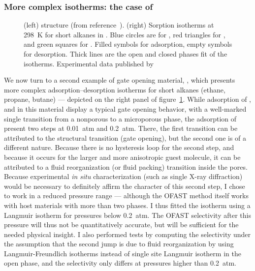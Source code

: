 \documentclass[thesis]{subfiles}
\begin{document}
\FloatBarrier
\subsubsection{More complex isotherms: the case of \RPMZn}

\begin{figure}[htp]
    \centering
    \hfill
    \raisebox{-0.5\height}{}
    \caption{(left) \RPMZn structure (from reference~\cite{Lan2009}).
    (right) Sorption isotherms at \SI{298}{K} for short
    alkanes in \RPMZn. Blue circles are for , red triangles for
    , and green squares for . Filled symbols for adsorption,
    empty symbols for desorption. Thick lines are the open and closed phases fit
    of the isotherms. Experimental data published by
    \citeauthor{Nijem2012}\cite{Nijem2012}}
    \label{fig:rpm3-zn}
\end{figure}

We now turn to a second example of gate opening material, \RPMZn\cite{Lan2009},
which presents more complex adsorption--desorption isotherms for short alkanes
(ethane, propane, butane) --- depicted on the right panel of
figure~\ref{fig:rpm3-zn}. While adsorption of , and  in this
material display a typical gate opening behavior, with a well-marked single
transition from a nonporous to a microporous phase, the adsorption of 
present two steps at \SI{0.01}{atm} and \SI{0.2}{atm}.  There, the first
transition can be attributed to the structural transition (gate opening), but
the second one is of a different nature. Because there is no hysteresis loop for
the second step, and because it occurs for the larger and more anisotropic guest
molecule, it can be attributed to a fluid reorganization (or fluid packing)
transition inside the pores. Because experimental \emph{in situ}
characterization (such as single X-ray diffraction) would be necessary to
definitely affirm the character of this second step, I chose to work in a
reduced pressure range --- although the OFAST method itself works with host
materials with more than two phases. I thus fitted the  isotherm using
a Langmuir isotherm for pressures below \SI{0.2}{atm}.  The OFAST selectivity
after this pressure will thus not be quantitatively accurate, but will be
sufficient for the needed physical insight. I also performed tests by computing
the selectivity under the assumption that the second jump is due to fluid
reorganization by using Langmuir-Freundlich isotherms instead of single site
Langmuir isotherm in the open phase, and the selectivity only differs at
pressures higher than \SI{0.2}{atm}. 
\end{document}
